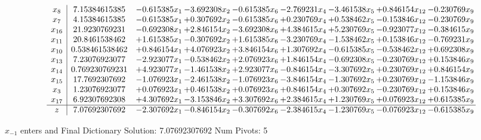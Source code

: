\documentclass[10pt]{article}
\begin{document}
 \[\begin{array}{c| c c@{\hskip 2pt} c@{\hskip 2pt} c@{\hskip 2pt} c@{\hskip 2pt} c@{\hskip 2pt} c@{\hskip 2pt} c@{\hskip 2pt} }
 x_{8}   &  7.15384615385 & -0.615385 x_{1} & -3.692308 x_{2} & -0.615385 x_{6} & -2.769231 x_{4} & -3.461538 x_{5} & + 0.846154 x_{12} & -0.230769 x_{9}\\
 x_{7}   &  4.15384615385 & -0.615385 x_{1} & + 0.307692 x_{2} & -0.615385 x_{6} & + 0.230769 x_{4} & + 0.538462 x_{5} & -0.153846 x_{12} & -0.230769 x_{9}\\
 x_{16}   &  21.9230769231 & -0.692308 x_{1} & + 2.846154 x_{2} & -3.692308 x_{6} & + 4.384615 x_{4} & + 5.230769 x_{5} & -0.923077 x_{12} & -0.384615 x_{9}\\
 x_{11}   &  20.8461538462 & + 1.615385 x_{1} & -0.307692 x_{2} & + 1.615385 x_{6} & -3.230769 x_{4} & -1.538462 x_{5} & + 0.153846 x_{12} & -0.769231 x_{9}\\
 x_{10}   &  0.538461538462 & + 0.846154 x_{1} & + 4.076923 x_{2} & + 3.846154 x_{6} & + 1.307692 x_{4} & -0.615385 x_{5} & -0.538462 x_{12} & + 0.692308 x_{9}\\
 x_{13}   &  7.23076923077 & -2.923077 x_{1} & -0.538462 x_{2} & + 2.076923 x_{6} & + 1.846154 x_{4} & -0.692308 x_{5} & -0.230769 x_{12} & + 0.153846 x_{9}\\
 x_{14}   &  0.769230769231 & + 4.923077 x_{1} & -1.461538 x_{2} & + 2.923077 x_{6} & -0.846154 x_{4} & -3.307692 x_{5} & + 0.230769 x_{12} & + 0.846154 x_{9}\\
 x_{15}   &  17.7692307692 & -1.076923 x_{1} & -2.461538 x_{2} & -1.076923 x_{6} & -3.846154 x_{4} & -1.307692 x_{5} & + 0.230769 x_{12} & -1.153846 x_{9}\\
 x_{3}   &  1.23076923077 & + 0.076923 x_{1} & + 0.461538 x_{2} & + 0.076923 x_{6} & + 0.846154 x_{4} & + 0.307692 x_{5} & -0.230769 x_{12} & + 0.153846 x_{9}\\
 x_{17}   &  6.92307692308 & + 4.307692 x_{1} & -3.153846 x_{2} & + 3.307692 x_{6} & + 2.384615 x_{4} & + 1.230769 x_{5} & + 0.076923 x_{12} & + 0.615385 x_{9}\\
\hline
z    &  7.07692307692 & -2.307692 x_{1} & -0.846154 x_{2} & -0.307692 x_{6} & -2.384615 x_{4} & -1.230769 x_{5} & -0.076923 x_{12} & -0.615385 x_{9}\\
\end{array}\]


 $ x_{-1} $ enters and Final Dictionary
Solution:  7.07692307692
Num Pivots:  5
\end{document}
